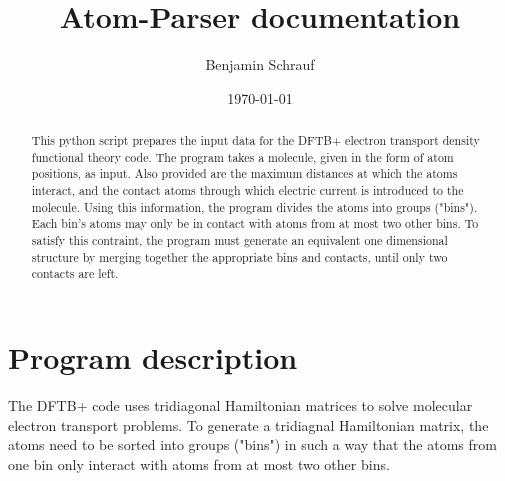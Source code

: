 \documentclass[11pt,a4paper]{article}
\begin{document}
\renewcommand{\thefootnote}{\fnsymbol{footnote}}
%
\newcommand {\D} {\frac {d}        {d z}     } %
\newcommand {\DD}{\frac {d^{2}}    {d z^{2}} }
%
%
\newcommand {\dt} {\frac {\partial }{\partial t } }
\newcommand {\dx} {\frac {\partial }{\partial x } }
\newcommand {\dy} {\frac {\partial }{\partial y } }
\newcommand {\dz} {\frac {\partial }{\partial z } }
%
\newcommand {\h} {\widehat   }                 %
\newcommand {\T} {\widetilde }                 %
%

\renewcommand{\abstractname}{Overview}



\title{Atom-Parser documentation}
\author{Benjamin Schrauf}
\date{\today}

\maketitle

\begin{abstract}
This python script prepares the input data for the DFTB+ electron transport density functional theory code. The program takes a molecule, given in the form of atom positions, as input. Also provided are the maximum distances at which the atoms interact, and the contact atoms through which electric current is introduced to the molecule. Using this information, the program divides the atoms into groups ("bins"). Each bin's atoms may only be in contact with atoms from at most two other bins. To satisfy this contraint, the program must generate an equivalent one dimensional structure by merging together the appropriate bins and contacts, until only two contacts are left.
\end{abstract}



\newpage


\section{Program description}

The DFTB+ code uses tridiagonal Hamiltonian matrices to solve molecular electron transport problems. To generate a tridiagnal Hamiltonian matrix, the atoms need to be sorted into groups ("bins") in such a way that the atoms from one bin only interact with atoms from at most two other bins.
\end{document}
